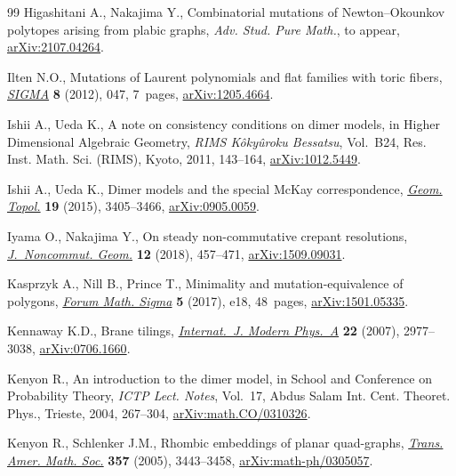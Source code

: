 \documentclass[pdftex]{sigma}%
\numberwithin{equation}{section}
\numberwithin{figure}{section}
\numberwithin{table}{section}
\begin{document}
\begin{thebibliography}{99}
Higashitani A., Nakajima Y., Combinatorial mutations of {N}ewton--{O}kounkov
 polytopes arising from plabic graphs, \textit{Adv. Stud. Pure Math.}, {t}o
 appear, \href{https://arxiv.org/abs/2107.04264}{arXiv:2107.04264}.

Ilten N.O., Mutations of {L}aurent polynomials and flat families with toric
 fibers, \href{https://doi.org/10.3842/SIGMA.2012.047}{\textit{SIGMA}} \textbf{8} (2012), 047, 7~pages, \href{https://arxiv.org/abs/1205.4664}{arXiv:1205.4664}.

Ishii A., Ueda K., A note on consistency conditions on dimer models, in Higher
 Dimensional Algebraic Geometry, \textit{RIMS K\^oky\^uroku Bessatsu}, Vol.~B24, Res. Inst. Math. Sci. (RIMS), Kyoto, 2011, 143--164, \href{https://arxiv.org/abs/1012.5449}{arXiv:1012.5449}.

Ishii A., Ueda K., Dimer models and the special {M}c{K}ay correspondence,
 \href{https://doi.org/10.2140/gt.2015.19.3405}{\textit{Geom. Topol.}} \textbf{19} (2015), 3405--3466, \href{https://arxiv.org/abs/0905.0059}{arXiv:0905.0059}.

Iyama O., Nakajima Y., On steady non-commutative crepant resolutions,
 \href{https://doi.org/10.4171/JNCG/283}{\textit{J.~Noncommut. Geom.}} \textbf{12} (2018), 457--471,
 \href{https://arxiv.org/abs/1509.09031}{arXiv:1509.09031}.

Kasprzyk A., Nill B., Prince T., Minimality and mutation-equivalence of
 polygons, \href{https://doi.org/10.1017/fms.2017.10}{\textit{Forum Math. Sigma}} \textbf{5} (2017), e18, 48~pages,
 \href{https://arxiv.org/abs/1501.05335}{arXiv:1501.05335}.

Kennaway K.D., Brane tilings, \href{https://doi.org/10.1142/S0217751X07036877}{\textit{Internat.~J. Modern Phys.~A}} \textbf{22}
 (2007), 2977--3038, \href{https://arxiv.org/abs/0706.1660}{arXiv:0706.1660}.

Kenyon R., An introduction to the dimer model, in School and {C}onference on
 {P}robability {T}heory, \textit{ICTP Lect. Notes}, Vol.~17, Abdus Salam Int. Cent.
 Theoret. Phys., Trieste, 2004, 267--304, \href{https://arxiv.org/abs/math.CO/0310326}{arXiv:math.CO/0310326}.

Kenyon R., Schlenker J.M., Rhombic embeddings of planar quad-graphs,
 \href{https://doi.org/10.1090/S0002-9947-04-03545-7}{\textit{Trans. Amer. Math. Soc.}} \textbf{357} (2005), 3443--3458,
 \href{https://arxiv.org/abs/math-ph/0305057}{arXiv:math-ph/0305057}.


\end{thebibliography}
\end{document}
